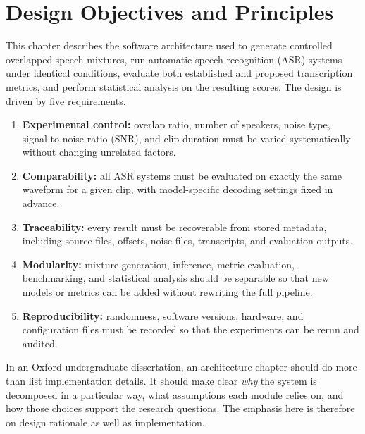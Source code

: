 
\section{Design Objectives and Principles}
This chapter describes the software architecture used to generate controlled overlapped-speech mixtures, run automatic speech recognition (ASR) systems under identical conditions, evaluate both established and proposed transcription metrics, and perform statistical analysis on the resulting scores. The design is driven by five requirements.

\begin{enumerate}
    \item \textbf{Experimental control:} overlap ratio, number of speakers, noise type, signal-to-noise ratio (SNR), and clip duration must be varied systematically without changing unrelated factors.
    \item \textbf{Comparability:} all ASR systems must be evaluated on exactly the same waveform for a given clip, with model-specific decoding settings fixed in advance.
    \item \textbf{Traceability:} every result must be recoverable from stored metadata, including source files, offsets, noise files, transcripts, and evaluation outputs.
    \item \textbf{Modularity:} mixture generation, inference, metric evaluation, benchmarking, and statistical analysis should be separable so that new models or metrics can be added without rewriting the full pipeline.
    \item \textbf{Reproducibility:} randomness, software versions, hardware, and configuration files must be recorded so that the experiments can be rerun and audited.
\end{enumerate}

In an Oxford undergraduate dissertation, an architecture chapter should do more than list implementation details. It should make clear \emph{why} the system is decomposed in a particular way, what assumptions each module relies on, and how those choices support the research questions. The emphasis here is therefore on design rationale as well as implementation.

